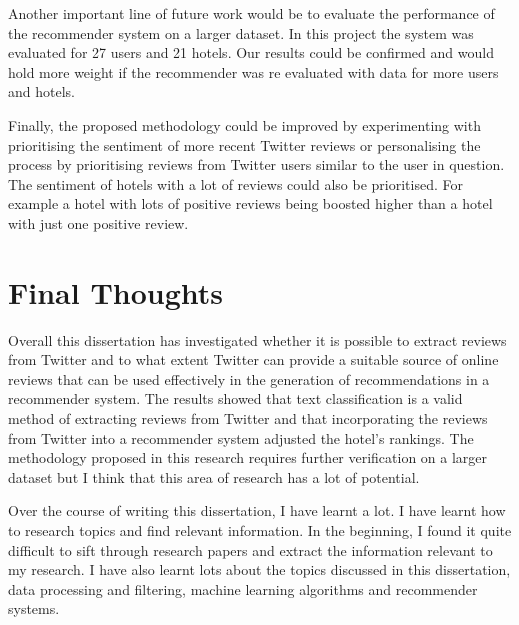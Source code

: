 Another important line of future work would be to evaluate the performance of the recommender system on a larger dataset. In this project the system was evaluated for 27 users and 21 hotels. Our results could be confirmed and would hold more weight if the recommender was re evaluated with data for more users and hotels.

Finally, the proposed methodology could be improved by experimenting with prioritising the sentiment of more recent Twitter reviews or personalising the process by prioritising reviews from Twitter users similar to the user in question. The sentiment of hotels with a lot of reviews could also be prioritised. For example a hotel with lots of positive reviews being boosted higher than a hotel with just one positive review.

\section{Final Thoughts}

Overall this dissertation has investigated whether it is possible to extract reviews from Twitter and to what extent Twitter can provide a suitable source of online reviews that can be used effectively in the generation of recommendations in a recommender system. The results showed that text classification is a valid method of extracting reviews from Twitter and that incorporating the reviews from Twitter into a recommender system adjusted the hotel's rankings. The methodology proposed in this research requires further verification on a larger dataset but I think that this area of research has a lot of potential. 

Over the course of writing this dissertation, I have learnt a lot. I have learnt how to research topics and find relevant information. In the beginning, I found it quite difficult to sift through research papers and extract the information relevant to my research. I have also learnt lots about the topics discussed in this dissertation, data processing and filtering, machine learning algorithms and recommender systems.